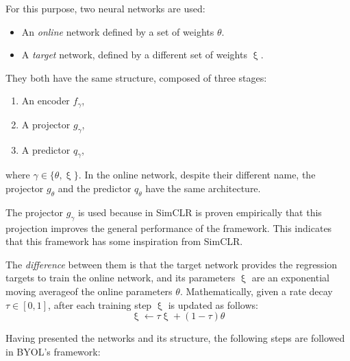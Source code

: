 For this purpose, two neural networks are used:
\begin{itemize}
\item An \emph{online} network defined by a set of weights $\theta$.

\item A \emph{target} network, defined by a different set of weights $\upxi$.
\end{itemize}

They both have the same structure, composed of three stages:
\begin{enumerate}
\item An encoder $f_\gamma$,
\item A projector $g_\gamma$,
\item A predictor $q_\gamma$,
\end{enumerate}
where $\gamma \in \{\theta,\upxi\}$. In the online network, despite their different name, the projector $g_\theta$ and the predictor $q_\theta$ have the same architecture.

\begin{remark}
The projector $g_\gamma$ is used because in SimCLR \citep{chen_simple_2020} is proven empirically that this projection improves the general performance of the framework. This indicates that this framework has some inspiration from SimCLR.
\end{remark}

The \emph{difference} between them is that the target network provides the regression targets to train the online network, and its parameters $\upxi$ are an exponential moving average\footnotemark of the online parameters $\theta$. Mathematically, given a rate decay $\tau \in [0,1]$, after each training step $\upxi$ is updated as follows:
\[
\upxi \leftarrow \tau \upxi + (1-\tau)\theta    
\]


Having presented the networks and its structure, the following steps are followed in BYOL's framework:

